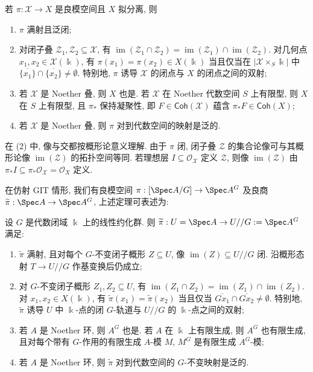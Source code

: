 \begin{theorem}\label{src:7.5.11}
若 $\pi:\mathcal X\to X$ 是良模空间且 $X$ 拟分离, 则
\begin{enumerate}[(1)]
\item $\pi$ 满射且泛闭;
\item 对闭子叠 $\mathcal Z_1,\mathcal Z_2\subseteq\mathcal X$, 有 $\operatorname{im}(\mathcal Z_1\cap\mathcal Z_2)=\operatorname{im}(\mathcal Z_1)\cap\operatorname{im}(\mathcal Z_2)$. 对几何点 $x_1,x_2\in\mathcal X(\Bbbk)$, 有 $\pi(x_1)=\pi(x_2)\in X(\Bbbk)$ 当且仅当在 $|\mathcal X\times_S\Bbbk|$ 中 $\overline{\{x_1\}}\cap\overline{\{x_2\}}\ne\emptyset$. 特别地, $\pi$ 诱导 $\mathcal X$ 的闭点与 $X$ 的闭点之间的双射;
\item 若 $\mathcal X$ 是 Noether 叠, 则 $X$ 也是. 若 $\mathcal X$ 在 Noether 代数空间 $S$ 上有限型, 则 $X$ 在 $S$ 上有限型, 且 $\pi_*$ 保持凝聚性, 即 $F\in\mathsf{Coh}(\mathcal X)$ 蕴含 $\pi_*F\in\mathsf{Coh}(X)$;
\item 若 $\mathcal X$ 是 Noether 叠, 则 $\pi$ 对到代数空间的映射是泛的.
\end{enumerate}
\end{theorem}
\begin{remark}\label{src:7.5.12}
在 (2) 中, 像与交都按概形论意义理解. 由于 $\pi$ 闭, 闭子叠 $\mathcal Z$ 的集合论像可与其概形论像 $\operatorname{im}(\mathcal Z)$ 的拓扑空间等同. 若理想层 $I\subseteq\mathcal O_{\mathcal X}$ 定义 $\mathcal Z$, 则像 $\operatorname{im}(\mathcal Z)$ 由 $\pi_*I\subseteq\pi_*\mathcal O_{\mathcal X}=\mathcal O_X$ 定义.
\end{remark}
在仿射 GIT 情形, 我们有良模空间 $\pi:[\Spec A/G]\to\Spec A^G$ 及良商 $\widetilde\pi:\Spec A\to\Spec A^G$, 上述定理可表述为:
\begin{corollary}[仿射 GIT]\label{src:7.5.13}
设 $G$ 是代数闭域 $\Bbbk$ 上的线性约化群. 则 $\widetilde\pi:U=\Spec A\to U//G:=\Spec A^G$ 满足:
\begin{enumerate}[(1)]
\item $\widetilde\pi$ 满射, 且对每个 $G$-不变闭子概形 $Z\subseteq U$, 像 $\operatorname{im}(Z)\subseteq U//G$ 闭. 沿概形态射 $T\to U//G$ 作基变换后仍成立;
\item 对 $G$-不变闭子概形 $Z_1,Z_2\subseteq U$, 有 $\operatorname{im}(Z_1\cap Z_2)=\operatorname{im}(Z_1)\cap\operatorname{im}(Z_2)$. 对 $x_1,x_2\in X(\Bbbk)$, 有 $\widetilde\pi(x_1)=\widetilde\pi(x_2)$ 当且仅当 $\overline{Gx_1}\cap\overline{Gx_2}\ne\emptyset$. 特别地, $\widetilde\pi$ 诱导 $U$ 中 $\Bbbk$-点的闭 $G$-轨道与 $U//G$ 的 $\Bbbk$-点之间的双射;
\item 若 $A$ 是 Noether 环, 则 $A^G$ 也是. 若 $A$ 在 $\Bbbk$ 上有限生成, 则 $A^G$ 也有限生成, 且对每个带有 $G$-作用的有限生成 $A$-模 $M$, $M^G$ 是有限生成 $A^G$-模;
\item 若 $A$ 是 Noether 环, 则 $\widetilde\pi$ 对到代数空间的 $G$-不变映射是泛的.
\end{enumerate}
\end{corollary}
